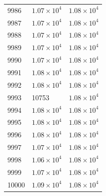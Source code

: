 \begin{table}[H]
\begin{tabular}{lll}
9986 & $\displaystyle 1.07 \times 10^{4}$ & $\displaystyle 1.08 \times 10^{4}$ \\
9987 & $\displaystyle 1.07 \times 10^{4}$ & $\displaystyle 1.08 \times 10^{4}$ \\
9988 & $\displaystyle 1.07 \times 10^{4}$ & $\displaystyle 1.08 \times 10^{4}$ \\
9989 & $\displaystyle 1.07 \times 10^{4}$ & $\displaystyle 1.08 \times 10^{4}$ \\
9990 & $\displaystyle 1.07 \times 10^{4}$ & $\displaystyle 1.08 \times 10^{4}$ \\
9991 & $\displaystyle 1.08 \times 10^{4}$ & $\displaystyle 1.08 \times 10^{4}$ \\
9992 & $\displaystyle 1.08 \times 10^{4}$ & $\displaystyle 1.08 \times 10^{4}$ \\
9993 & 10753 & $\displaystyle 1.08 \times 10^{4}$ \\
9994 & $\displaystyle 1.08 \times 10^{4}$ & $\displaystyle 1.08 \times 10^{4}$ \\
9995 & $\displaystyle 1.08 \times 10^{4}$ & $\displaystyle 1.08 \times 10^{4}$ \\
9996 & $\displaystyle 1.08 \times 10^{4}$ & $\displaystyle 1.08 \times 10^{4}$ \\
9997 & $\displaystyle 1.07 \times 10^{4}$ & $\displaystyle 1.08 \times 10^{4}$ \\
9998 & $\displaystyle 1.06 \times 10^{4}$ & $\displaystyle 1.08 \times 10^{4}$ \\
9999 & $\displaystyle 1.07 \times 10^{4}$ & $\displaystyle 1.08 \times 10^{4}$ \\
10000 & $\displaystyle 1.09 \times 10^{4}$ & $\displaystyle 1.08 \times 10^{4}$ \\
\bottomrule
\end{tabular}

\end{table}
